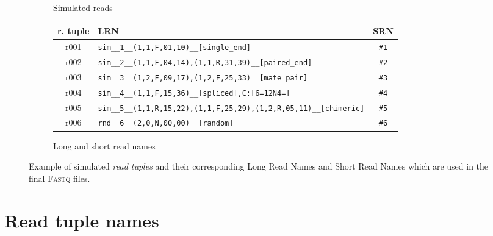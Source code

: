 \documentclass[10pt,a4paper]{article}
\begin{document}
\begin{figure}[!tpb]
\centering

\begin{subfigure}{1.0\linewidth}
\centering
{}

\caption{Simulated reads}
\end{subfigure}


\begin{subfigure}{1.0\linewidth}
\centering
\begin{tabular}{c|p{12.0cm}|c}
 \textbf{r. tuple} & \textbf{LRN} & \textbf{SRN} \\\hline
 r001
 	& \texttt{sim\_\_1\_\_(1,1,F,01,10)\_\_[single\_end]}
 	& \texttt{\#1}
 \\\hline
 r002
 	& \texttt{sim\_\_2\_\_(1,1,F,04,14),(1,1,R,31,39)\_\_[paired\_end]}
 	& \texttt{\#2}
 \\\hline
 r003
 	& \texttt{sim\_\_3\_\_(1,2,F,09,17),(1,2,F,25,33)\_\_[mate\_pair]}
 	& \texttt{\#3}
 \\\hline
 r004
 	& \texttt{sim\_\_4\_\_(1,1,F,15,36)\_\_[spliced],{}C:[6=12N4=]}
   	& \texttt{\#4}
 \\\hline
 r005
 	& \texttt{sim\_\_5\_\_(1,1,R,15,22),(1,1,F,25,29),(1,2,R,05,11)\_\_[chimeric]}
 	& \texttt{\#5}
 \\\hline
 r006
 	& \texttt{rnd\_\_6\_\_(2,0,N,00,00)\_\_[random]}
 	& \texttt{\#6}\\
\end{tabular}
\caption{Long and short read names}
\end{subfigure}
\caption{Example of simulated {\em read tuples} and their corresponding
Long Read Names and Short Read Names which are used
in the final \textsc{Fastq} files.
}
\end{figure}



\section{Read tuple names}
\end{document}
